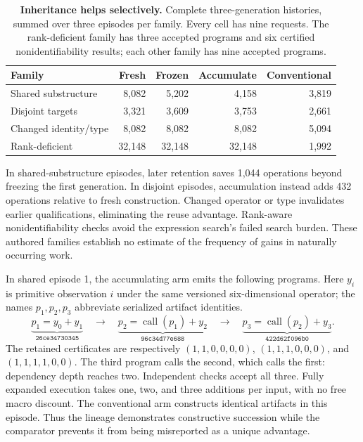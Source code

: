 \documentclass[10pt,a4paper]{article}
\newcommand{\lead}[1]{\par\Needspace{5\baselineskip}\medskip\noindent{\sffamily\bfseries\color{violetink}#1}\par\smallskip}
\begin{document}
\begin{table}[htbp]
\centering\small
\caption{\textbf{Inheritance helps selectively.} Complete three-generation histories, summed over three episodes per family. Every cell has nine requests. The rank-deficient family has three accepted programs and six certified nonidentifiability results; each other family has nine accepted programs.}
\label{tab:foundry-family}
\begin{tabularx}{\textwidth}{@{}Yrrrr@{}}
\toprule
\textbf{Family} & \textbf{Fresh} & \textbf{Frozen} & \textbf{Accumulate} & \textbf{Conventional}\\
\midrule
Shared substructure & 8,082 & 5,202 & 4,158 & 3,819\\
Disjoint targets & 3,321 & 3,609 & 3,753 & 2,661\\
Changed identity/type & 8,082 & 8,082 & 8,082 & 5,094\\
Rank-deficient & 32,148 & 32,148 & 32,148 & 1,992\\
\bottomrule
\end{tabularx}
\end{table}

In shared-substructure episodes, later retention saves 1,044 operations beyond freezing the first generation. In disjoint episodes, accumulation instead adds 432 operations relative to fresh construction. Changed operator or type invalidates earlier qualifications, eliminating the reuse advantage. Rank-aware nonidentifiability checks avoid the expression search's failed search burden. These authored families establish no estimate of the frequency of gains in naturally occurring work.

\lead{An actual constructed lineage}
In shared episode 1, the accumulating arm emits the following programs. Here $y_i$ is primitive observation $i$ under the same versioned six-dimensional operator; the names $p_1,p_2,p_3$ abbreviate serialized artifact identities.
\begin{equation}
 \underbrace{p_1=y_0+y_1}_{\texttt{26ce34730345}}
 \quad\longrightarrow\quad
 \underbrace{p_2=\operatorname{call}(p_1)+y_2}_{\texttt{96c34d77e688}}
 \quad\longrightarrow\quad
 \underbrace{p_3=\operatorname{call}(p_2)+y_3}_{\texttt{422d62f096b0}}.
\label{eq:lineage}
\end{equation}
The retained certificates are respectively $(1,1,0,0,0,0)$, $(1,1,1,0,0,0)$, and $(1,1,1,1,0,0)$. The third program calls the second, which calls the first: dependency depth reaches two. Independent checks accept all three. Fully expanded execution takes one, two, and three additions per input, with no free macro discount. The conventional arm constructs identical artifacts in this episode. Thus the lineage demonstrates constructive succession while the comparator prevents it from being misreported as a unique advantage.
\end{document}
